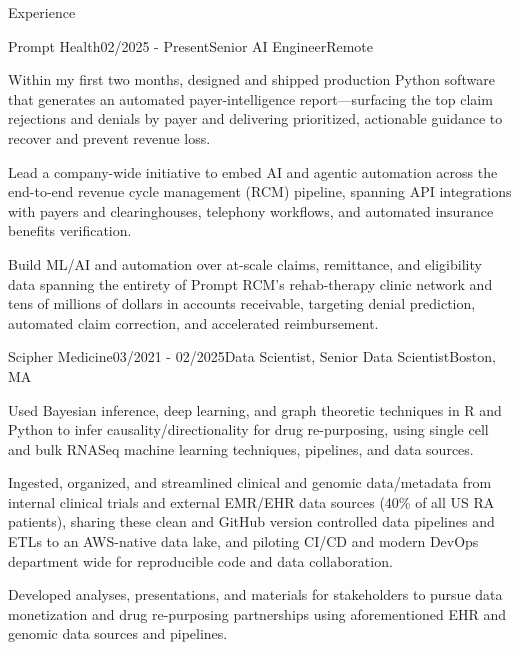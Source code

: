 \documentclass{resume} %
\begin{document}
\begin{rSection}{Experience}

\begin{rSubsection}{Prompt Health}{02/2025 - Present}{Senior AI Engineer}{Remote}

\item Within my first two months, designed and shipped production Python software that generates an automated payer-intelligence report---surfacing the top claim rejections and denials by payer and delivering prioritized, actionable guidance to recover and prevent revenue loss.

\item Lead a company-wide initiative to embed AI and agentic automation across the end-to-end revenue cycle management (RCM) pipeline, spanning API integrations with payers and clearinghouses, telephony workflows, and automated insurance benefits verification.

\item Build ML/AI and automation over at-scale claims, remittance, and eligibility data spanning the entirety of Prompt RCM's rehab-therapy clinic network and tens of millions of dollars in accounts receivable, targeting denial prediction, automated claim correction, and accelerated reimbursement.

\end{rSubsection}


\begin{rSubsection}{Scipher Medicine}{03/2021 - 02/2025}{Data Scientist, Senior Data Scientist}{Boston, MA}

\item Used Bayesian inference, deep learning, and graph theoretic techniques in R and Python to infer causality/directionality for drug re-purposing, using single cell and bulk RNASeq machine learning techniques, pipelines, and data sources.

\item Ingested, organized, and streamlined clinical and genomic data/metadata from internal clinical trials and external EMR/EHR data sources (40\% of all US RA patients), sharing these clean and GitHub version controlled data pipelines and ETLs to an AWS-native data lake, and piloting CI/CD and modern DevOps department wide for reproducible code and data collaboration.

\item Developed analyses, presentations, and materials for stakeholders to pursue data monetization and drug re-purposing partnerships using aforementioned EHR and genomic data sources and pipelines.


\end{rSubsection}
\end{rSection}
\end{document}
